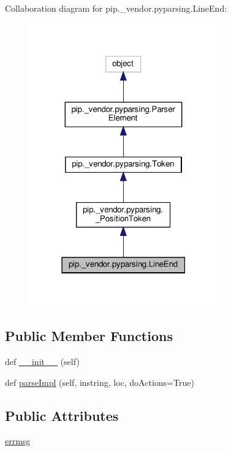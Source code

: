 Collaboration diagram for pip.\+\_\+vendor.\+pyparsing.\+Line\+End\+:
\nopagebreak
\begin{figure}[H]
\begin{center}
\leavevmode
\includegraphics[width=230pt]{classpip_1_1__vendor_1_1pyparsing_1_1LineEnd__coll__graph}
\end{center}
\end{figure}
\subsection*{Public Member Functions}
\begin{DoxyCompactItemize}
\item 
def \hyperlink{classpip_1_1__vendor_1_1pyparsing_1_1LineEnd_a0144745f4de7a88215f3037b8f4efac4}{\+\_\+\+\_\+init\+\_\+\+\_\+} (self)
\item 
def \hyperlink{classpip_1_1__vendor_1_1pyparsing_1_1LineEnd_a3a694e390e3081468758134c89604e4a}{parse\+Impl} (self, instring, loc, do\+Actions=True)
\end{DoxyCompactItemize}
\subsection*{Public Attributes}
\begin{DoxyCompactItemize}
\item 
\hyperlink{classpip_1_1__vendor_1_1pyparsing_1_1LineEnd_a066723867323c4f42e1bdcf2ccd0ca96}{errmsg}
\end{DoxyCompactItemize}
